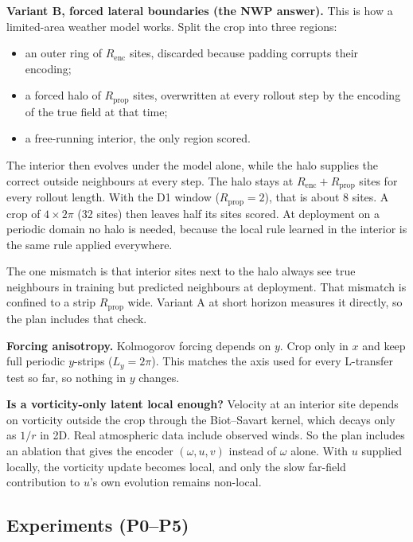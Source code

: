 \documentclass[11pt]{article}
\begin{document}
\textbf{Variant B, forced lateral boundaries (the NWP answer).} This is
how a limited-area weather model works. Split the crop into three
regions:
\begin{itemize}[leftmargin=*]
\item an outer ring of $R_{\mathrm{enc}}$ sites, discarded because padding
  corrupts their encoding;
\item a forced halo of $R_{\mathrm{prop}}$ sites, overwritten at every
  rollout step by the encoding of the true field at that time;
\item a free-running interior, the only region scored.
\end{itemize}
The interior then evolves under the model alone, while the halo supplies
the correct outside neighbours at every step. The halo stays at
$R_{\mathrm{enc}}{+}R_{\mathrm{prop}}$ sites for every rollout length.
With the D1 window ($R_{\mathrm{prop}}{=}2$), that is about 8 sites. A
crop of $4\times2\pi$ (32 sites) then leaves half its sites scored. At
deployment on a periodic domain no halo is needed, because the local rule
learned in the interior is the same rule applied everywhere.

The one mismatch is that interior sites next to the halo always see true
neighbours in training but predicted neighbours at deployment. That
mismatch is confined to a strip $R_{\mathrm{prop}}$ wide. Variant A at
short horizon measures it directly, so the plan includes that check.

\textbf{Forcing anisotropy.} Kolmogorov forcing depends on $y$. Crop only
in $x$ and keep full periodic $y$-strips ($L_y{=}2\pi$). This matches the
axis used for every L-transfer test so far, so nothing in $y$ changes.

\textbf{Is a vorticity-only latent local enough?} Velocity at an interior
site depends on vorticity outside the crop through the Biot--Savart
kernel, which decays only as $1/r$ in 2D. Real atmospheric data include
observed winds. So the plan includes an ablation that gives the encoder
$(\omega,u,v)$ instead of $\omega$ alone. With $u$ supplied locally, the
vorticity update becomes local, and only the slow far-field contribution
to $u$'s own evolution remains non-local.

\subsection{Experiments (P0--P5)}
\end{document}
